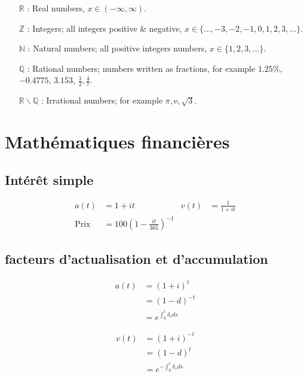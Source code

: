 \documentclass[10pt, french]{article}
\begin{document}
\begin{multicols*}{2}
\begin{itemize}
	\item[$\mathds{R}$]: Real numbers, $x \in (-\infty, \infty)$.
	\item[$\mathds{Z}$]: Integers; all integers positive \& negative, $x \in \{\dots, -3, -2, -1, 0, 1, 2, 3, \dots\}$.
	\item[$\mathds{N}$]: Natural numbers; all positive integers numbers, $x \in \{1, 2, 3, \dots\}$.
	\item[$\mathds{Q}$]: Rational numbers; numbers written as fractions, for example $1.25\%$, $-0.4775$, $3.\overline{153}$, $\frac{1}{2}, \frac{4}{7}$.	
	\item[$\mathds{R} \backslash \mathds{Q}$]: Irrational numbers; for example $\pi, \mathrm{e}, \sqrt{3}$.
\end{itemize}

\section*{Mathématiques financières}

\subsection*{Intérêt simple}
\begin{align*}
	a(t)
		&=	1 + it &
	v(t)
		&=	\frac{1}{1 + it} \\
	\text{Prix}
		&=	100 \left( 1 - \frac{it}{365} \right)^{-1}
\end{align*}

\subsection*{facteurs d'actualisation et d'accumulation}
\begin{minipage}[t]{.5\linewidth}
\begin{align*}
	a(t) 
		&= 	(1 + i)^{t} 		\\
		&= 	(1 - d)^{-t}	\\
		&= 	e^{\int_{0}^{t} \delta_s ds} 
\end{align*}
\end{minipage}
\begin{minipage}[t]{.5\linewidth}
	\begin{align*}
	v(t) 
		&=	(1 + i)^{-t}		\\
		&=	(1 - d)^{t}	 	\\
		&= 	e^{-\int_{0}^{t} \delta_s ds} 
\end{align*}
\end{minipage}


\end{multicols*}
\end{document}
